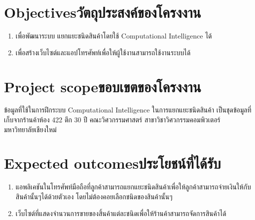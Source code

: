 \section{\ifenglish Objectives\else วัตถุประสงค์ของโครงงาน\fi}
\begin{enumerate}
    \item เพื่อพัฒนาระบบ แยกแยะชนิดสินค้าโดยใช้ Computational Intelligence ได้
    \item เพื่อสร้างเว็บไซต์และแอปโทรศัพท์เพื่อให้ผู้ใช้งานสามารถใช้งานระบบได้
\end{enumerate}

\section{\ifenglish Project scope\else ขอบเขตของโครงงาน\fi}
ข้อมูลที่ใช้ในการฝึกระบบ Computational Intelligence ในการแยกแยะชนิดสินค้า
เป็นชุดข้อมูลที่เก็บจากร้านค้าห้อง 422 ตึก 30 ปี คณะวิศวกรรมศาสตร์ สาขาวิชาวิศวกรรมคอมพิวเตอร์ มหาวิทยาลัยเชียงใหม่


\section{\ifenglish Expected outcomes\else ประโยชน์ที่ได้รับ\fi}
\begin{enumerate}
    \item แอพลิเคชันในโทรศัพท์มือถือที่ลูกค้าสามารถแยกแยะชนิดสินค้าเพื่อให้ลูกค้าสามารถจ่ายเงินให้กับสินค้านั้นๆได้ด้วยตัวเอง โดยไม่ต้องคอยเลือกชนิดของสินค้านั้นๆ
    \item เว็บไซต์ที่แสดงจำนวนการขายของสิ้นค้าแต่ละชนิดเพื่อให้ร้านค้าสามารถจัดการสินค้าได้
\end{enumerate}
